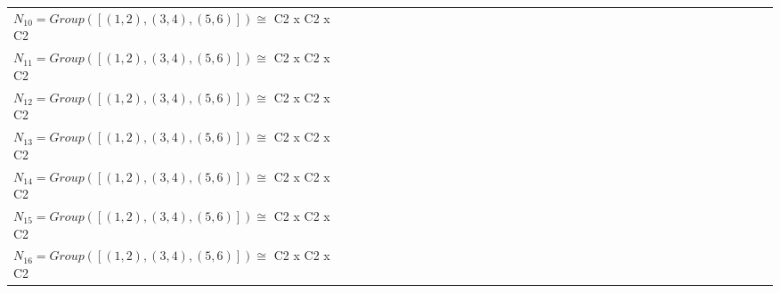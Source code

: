 \documentclass[varwidth=\maxdimen,border=10]{standalone}
\begin{document}
\begin{tabular}{@{}l@{}l@{}l@{}l@{}l@{}l@{}l@{}l@{}l@{}l@{}l@{}l@{}l@{}l@{}l@{}l@{}l@{}l@{}l@{}l@{}l@{}l@{}l@{}l@{}l@{}l@{}l@{}l@{}l@{}l@{}l@{}l@{}l@{}l@{}l@{}l@{}}
$N_{10} = Group( [ (1,2), (3,4), (5,6) ] )\cong$ C2 x C2 x C2\ \\
$N_{11} = Group( [ (1,2), (3,4), (5,6) ] )\cong$ C2 x C2 x C2\ \\
$N_{12} = Group( [ (1,2), (3,4), (5,6) ] )\cong$ C2 x C2 x C2\ \\
$N_{13} = Group( [ (1,2), (3,4), (5,6) ] )\cong$ C2 x C2 x C2\ \\
$N_{14} = Group( [ (1,2), (3,4), (5,6) ] )\cong$ C2 x C2 x C2\ \\
$N_{15} = Group( [ (1,2), (3,4), (5,6) ] )\cong$ C2 x C2 x C2\ \\
$N_{16} = Group( [ (1,2), (3,4), (5,6) ] )\cong$ C2 x C2 x C2\end{tabular}
\end{document}
